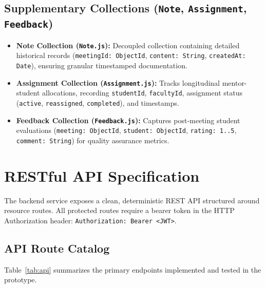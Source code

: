 \documentclass[11pt,a4paper]{article}
\begin{document}
\subsection{Supplementary Collections (\texttt{Note}, \texttt{Assignment}, \texttt{Feedback})}
\begin{itemize}[leftmargin=1.4em, itemsep=0.2em]
  \item \textbf{Note Collection (\texttt{Note.js}):} Decoupled collection containing detailed historical records (\texttt{meetingId: ObjectId}, \texttt{content: String}, \texttt{createdAt: Date}), ensuring granular timestamped documentation.
  \item \textbf{Assignment Collection (\texttt{Assignment.js}):} Tracks longitudinal mentor-student allocations, recording \texttt{studentId}, \texttt{facultyId}, assignment status (\texttt{active}, \texttt{reassigned}, \texttt{completed}), and timestamps.
  \item \textbf{Feedback Collection (\texttt{Feedback.js}):} Captures post-meeting student evaluations (\texttt{meeting: ObjectId}, \texttt{student: ObjectId}, \texttt{rating: 1..5}, \texttt{comment: String}) for quality assurance metrics.
\end{itemize}

\section{RESTful API Specification}
The backend service exposes a clean, deterministic REST API structured around resource routes. All protected routes require a bearer token in the HTTP Authorization header: \texttt{Authorization: Bearer <JWT>}.

\subsection{API Route Catalog}
Table~\ref{tab:api} summarizes the primary endpoints implemented and tested in the prototype.
\end{document}
